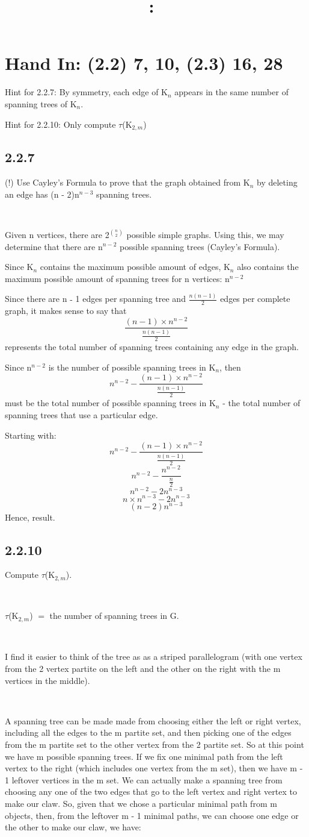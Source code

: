\documentclass{article}
\title{
    \vspace{2in}
    \textmd{\textbf{\hmwkClass:\ \hmwkTitle}}\\
    \normalsize\vspace{0.1in}\small\vspace{0.1in}\large{\textit{\hmwkClassInstructor}}
    \vspace{3in}
}
\author{\hmwkAuthorName}
\date{}
\newcommand{\mt}[1]{\ensuremath{#1}}
\newcommand\bsc[2][\DefaultOpt]{%
  \def\DefaultOpt{#2}%
  \section[#1]{#2}%
}
\newcommand\ssc[2][\DefaultOpt]{%
  \def\DefaultOpt{#2}%
  \subsection[#1]{#2}%
}
\newcommand{\ms}{\mt{\operatorname{-}} }
\newcommand{\eql}{ \mt{\operatorname{=}} }
\newcommand{\uw}[2]{#1\mt{_{#2}}}
\newcommand{\uf}[2]{#1\mt{^{#2}}}
\newcommand{\frc}[2]{\mt{\frac{#1}{#2}}}
\newcommand{\nck}[2]{\mt{{#1 \choose #2}}}
\newcommand{\eqn}[1]{\[#1\]}
\newcommand\tab[1][1cm]{\hspace*{#1}}
\begin{document}
\bsc{Hand In: (2.2) 7, 10, \tab (2.3) 16, 28}{
Hint for 2.2.7: By symmetry, each edge of \uw{K}{n} appears in the same number of spanning trees of \uw{K}{n}.

Hint for 2.2.10: Only compute $\tau$(\uw{K}{2, m})

\ssc{2.2.7}{

(!) Use Cayley's Formula to prove that the graph obtained from \uw{K}{n} by deleting an edge has (n \ms 2)\uf{n}{n - 3} spanning trees.

\

Given n vertices, there are \uf{2}{\nck{n}{2}} possible simple graphs. Using this, we may determine that there are \uf{n}{n - 2} possible spanning trees (Cayley's Formula).

Since \uw{K}{n} contains the maximum possible amount of edges, \uw{K}{n} also contains the maximum possible amount of spanning trees for n vertices: \uf{n}{n - 2}

Since there are n \ms 1 edges per spanning tree and \frc{n(n - 1)}{2} edges per complete graph, it makes sense to say that
\eqn{\frac{(n - 1) \times n^{n - 2}}{\frac{n(n - 1)}{2}}}
represents the total number of spanning trees containing any edge in the graph.

Since \uf{n}{n - 2} is the number of possible spanning trees in \uw{K}{n}, then
\eqn{n^{n - 2} - \frac{(n - 1) \times n^{n - 2}}{\frac{n(n - 1)}{2}}}
must be the total number of possible spanning trees in \uw{K}{n} \ms the total number of spanning trees that use a particular edge.

Starting with:
\eqn{n^{n - 2} - \frac{(n - 1) \times n^{n - 2}}{\frac{n(n - 1)}{2}}}
\eqn{n^{n - 2} - \frac{n^{n - 2}}{\frac{n}{2}}}
\eqn{n^{n - 2} - 2n^{n - 3}}
\eqn{n \times n^{n - 3} - 2n^{n - 3}}
\eqn{(n - 2)n^{n - 3}}
Hence, result.

}

\newpage

\ssc{2.2.10}{

Compute $\tau$(\uw{K}{2, m}).

\

$\tau$(\uw{K}{2, m}) \eql the number of spanning trees in G.

\

I find it easier to think of the tree as as a striped parallelogram (with one vertex from the 2 vertex partite on the left and the other on the right with the m vertices in the middle).

\

A spanning tree can be made made from choosing either the left or right vertex, including all the edges to the m partite set, and then picking one of the edges from the m partite set to the other vertex from the 2 partite set. So at this point we have m possible spanning trees. If we fix one minimal path from the left vertex to the right (which includes one vertex from the m set), then we have m - 1 leftover vertices in the m set. We can actually make a spanning tree from choosing any one of the two edges that go to the left vertex and right vertex to make our claw. So, given that we chose a particular minimal path from m objects, then, from the leftover m - 1 minimal paths, we can choose one edge or the other to make our claw, we have:

}}
\end{document}
